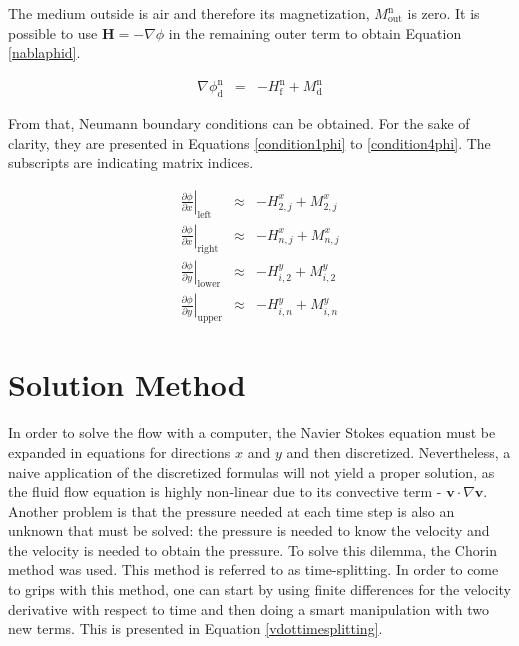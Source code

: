 \documentclass[journal]{IEEEtran}
\begin{document}
The medium outside is air and therefore its magnetization, $M_{\mathrm{out}}^{\mathrm{n}}$ is zero. It is possible to use $\mathbf{H} = -\nabla \phi$ in the remaining outer term to obtain Equation \ref{nablaphid}.

\begin{eqnarray}
\nabla\phi_{\mathrm{d}}^{\mathrm{n}} & = & -H_{\mathrm{f}}^{\mathrm{n}} + M_{\mathrm{d}}^{\mathrm{n}} \label{nablaphid}
\end{eqnarray}

From that, Neumann boundary conditions can be obtained. For the sake of clarity, they are presented in Equations \ref{condition1phi} to \ref{condition4phi}. The subscripts are indicating matrix indices.

\begin{eqnarray}
\left.\frac{\partial \phi}{\partial x}\right|_{\mathrm{left}}\;\;&\approx&- H^{x}_{2,j} + M^{x}_{2,j}\label{condition1phi}\\
\left.\frac{\partial \phi}{\partial x}\right|_{\mathrm{right}}&\approx&- H^{x}_{n,j} + M^{x}_{n,j}\\
\left.\frac{\partial \phi}{\partial y}\right|_{\mathrm{lower}}&\approx&- H^{y}_{i,2} + M^{y}_{i,2}\\
\left.\frac{\partial \phi}{\partial y}\right|_{\mathrm{upper}}&\approx&- H^{y}_{i,n} + M^{y}_{i,n}\label{condition4phi}
\end{eqnarray}

\section{Solution Method}
In order to solve the flow with a computer, the Navier Stokes equation must be expanded in equations for directions $x$ and $y$ and then discretized. Nevertheless, a naive application of the discretized formulas will not yield a proper solution, as the fluid flow equation is highly non-linear due to its convective term - $\mathbf{v}\cdot \nabla \mathbf{v}$. Another problem is that the pressure needed at each time step is also an unknown that must be solved: the pressure is needed to know the velocity and the velocity is needed to obtain the pressure. To solve this dilemma, the Chorin method \cite{Chorin1997118} was used. This method is referred to as time-splitting. In order to come to grips with this method, one can start by using finite differences for the velocity derivative with respect to time and then doing a smart manipulation with two new terms. This is presented in Equation \ref{vdottimesplitting}.
\end{document}
